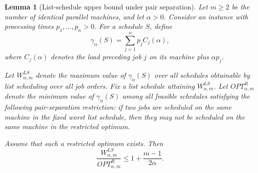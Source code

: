 \documentclass[11pt]{article}
\newtheorem{lemma}{Lemma}
\begin{document}
\begin{lemma}[List-schedule upper bound under pair separation]
Let \(m\ge 2\) be the number of identical parallel machines, and let
\(\alpha>0\). Consider an instance with processing times
\(p_1,\dots,p_n>0\). For a schedule \(S\), define
\[
\gamma_{\alpha}(S)=\sum_{j=1}^n p_j C_j(\alpha),
\]
where \(C_j(\alpha)\) denotes the load preceding job \(j\) on its machine plus
\(\alpha p_j\).

Let \(W^{LS}_{\alpha,m}\) denote the maximum value of \(\gamma_{\alpha}(S)\) over all
schedules obtainable by list scheduling over all job orders. Fix a list
schedule attaining \(W^{LS}_{\alpha,m}\). Let \(OPT^R_{\alpha,m}\) denote the
minimum value of \(\gamma_{\alpha}(S)\) among all feasible schedules satisfying the
following pair-separation restriction: if two jobs are scheduled on the same
machine in the fixed worst list schedule, then they may not be scheduled on
the same machine in the restricted optimum.

Assume that such a restricted optimum exists. Then
\[
\frac{W^{LS}_{\alpha,m}}{OPT^R_{\alpha,m}}
\le
1+\frac{m-1}{2\alpha}.
\]
\end{lemma}
\end{document}
